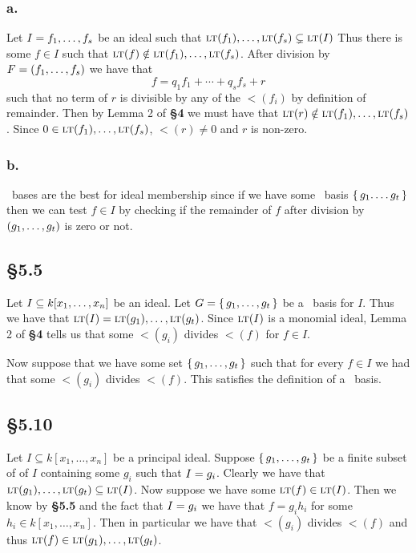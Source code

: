 \documentclass[letterpaper]{article}
\begin{document}
\subsubsection*{a.}

Let $I = \gen{f_{1}, \ldots, f_{s}}$ be an ideal such that $\gen{\lt(f_{1}), \ldots, \lt(f_{s})} \subsetneq \gen{\lt(I)}$ Thus there is some $f \in I$ such that $\lt(f) \notin \gen{\lt(f_{1}), \ldots, \lt(f_{s})}$.
After division by $F = \pqty{f_{1}, \ldots, f_{s}}$ we have that
\[
  f = q_{1}f_{1} + \cdots + q_{s}f_{s} + r
\]
such that no term of $r$ is divisible by any of the $\lt(f_{i})$ by definition of remainder.
Then by Lemma 2 of \textbf{\S 4} we must have that $\lt(r) \notin \gen{\lt(f_{1}), \ldots, \lt(f_{s})}$.
Since $0 \in \gen{\lt(f_{1}), \ldots, \lt(f_{s})}$, $\lt(r) \neq 0$ and $r$ is non-zero.

\subsubsection*{b.}

\Grobner\ bases are the best for ideal membership since if we have some \Grobner\ basis $\set{g_{1}.
\ldots g_{t}}$ then we can test $f \in I$ by checking if the remainder of $f$ after division by $\pqty{g_{1}, \ldots, g_{t}}$ is zero or not.

\clearpage

\subsection*{\S 5.5}

Let $I \subseteq k\bqty{x_{1}, \ldots, x_{n}}$ be an ideal.
Let $G = \set{g_{1}, \ldots, g_{t}}$ be a \Grobner\ basis for $I$.
Thus we have that $\gen{\lt(I)} = \gen{\lt(g_{1}), \ldots, \lt(g_{t})}$.
Since $\gen{\lt(I)}$ is a monomial ideal, Lemma 2 of \textbf{\S 4} tells us that some $\lt(g_{i})$ divides $\lt(f)$ for $f \in I$.

Now suppose that we have some set $\set{g_{1}, \ldots, g_{t}}$ such that for every $f \in I$ we had that some $\lt(g_{i})$ divides $\lt(f)$.
This satisfies the definition of a \Grobner\ basis.

\subsection*{\S 5.10}

Let $I \subseteq k[x_{1}, \ldots, x_{n}]$ be a principal ideal.
Suppose $\set{g_{1}, \ldots, g_{t}}$ be a finite subset of of $I$ containing some $g_{i}$ such that $I = \gen{g_{i}}$.
Clearly we have that $\gen{\lt(g_{1}), \ldots, \lt(g_{t})} \subseteq \gen{\lt(I)}$.
Now suppose we have some $\lt(f) \in \gen{\lt(I)}$.
Then we know by \textbf{\S 5.5} and the fact that $I = \gen{g_{i}}$ we have that $f = g_{i} h_{i}$ for some $h_{i} \in k[x_{1}, \ldots, x_{n}]$.
Then in particular we have that $\lt(g_{i})$ divides $\lt(f)$ and thus $\lt(f) \in \gen{\lt(g_{1}), \ldots, \lt(g_{t})}$.
\end{document}
